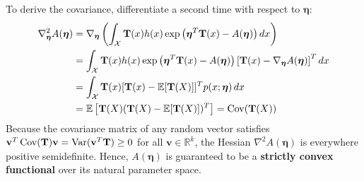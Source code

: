 To derive the covariance, differentiate a second time with respect to $\boldsymbol{\eta}$:
\begin{align}
\nabla_{\boldsymbol{\eta}}^2 A(\boldsymbol{\eta}) &= \nabla_{\boldsymbol{\eta}} \left( \int_{\mathcal{X}} \mathbf{T}(x) h(x) \exp\left( \boldsymbol{\eta}^T \mathbf{T}(x) - A(\boldsymbol{\eta}) \right) dx \right) \nonumber \\
&= \int_{\mathcal{X}} \mathbf{T}(x) h(x) \exp\left( \boldsymbol{\eta}^T \mathbf{T}(x) - A(\boldsymbol{\eta}) \right) \left[ \mathbf{T}(x) - \nabla_{\boldsymbol{\eta}} A(\boldsymbol{\eta}) \right]^T dx \nonumber \\
&= \int_{\mathcal{X}} \mathbf{T}(x) [\mathbf{T}(x) - \operatorname{\mathbb{E}}[\mathbf{T}(X)]]^T p(x; \boldsymbol{\eta}) \, dx \nonumber \\
&= \operatorname{\mathbb{E}}\left[ \mathbf{T}(X) (\mathbf{T}(X) - \operatorname{\mathbb{E}}[\mathbf{T}(X)])^T \right] = \operatorname{Cov}(\mathbf{T}(X))
\end{align}
Because the covariance matrix of any random vector satisfies $\mathbf{v}^T \operatorname{Cov}(\mathbf{T})\mathbf{v} = \operatorname{Var}(\mathbf{v}^T \mathbf{T}) \ge 0$ for all $\mathbf{v} \in \mathbb{R}^k$, the Hessian $\nabla^2 A(\boldsymbol{\eta})$ is everywhere positive semidefinite. Hence, $A(\boldsymbol{\eta})$ is guaranteed to be a \textbf{strictly convex functional} over its natural parameter space.

